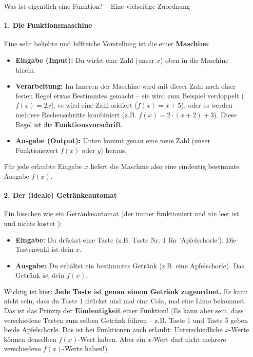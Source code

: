 \begin{infoboxumgebung}{Was ist eigentlich eine Funktion? – Eine vielseitige Zuordnung}
\paragraph{1. Die Funktionsmaschine}
Eine sehr beliebte und hilfreiche Vorstellung ist die einer \textbf{Maschine}:
\begin{itemize}
    \item \textbf{Eingabe (Input):} Du wirfst eine Zahl (unser $x$) oben in die Maschine hinein.
    \item \textbf{Verarbeitung:} Im Inneren der Maschine wird mit dieser Zahl nach einer festen Regel etwas Bestimmtes gemacht – sie wird zum Beispiel verdoppelt ($f(x)=2x$), es wird eine Zahl addiert ($f(x)=x+5$), oder es werden mehrere Rechenschritte kombiniert (z.B. $f(x) = 2 \cdot (x+2) + 3$). Diese Regel ist die \textbf{Funktionsvorschrift}.
    \item \textbf{Ausgabe (Output):} Unten kommt genau eine neue Zahl (unser Funktionswert $f(x)$ oder $y$) heraus.
\end{itemize}
Für jede erlaubte Eingabe $x$ liefert die Maschine also eine eindeutig bestimmte Ausgabe $f(x)$.

\paragraph{2. Der (ideale) Getränkeautomat}
Ein bisschen wie ein Getränkeautomat (der immer funktioniert und nie leer ist und nichts kostet \smiley{}):
\begin{itemize}
    \item \textbf{Eingabe:} Du drückst eine Taste (z.B. Taste Nr. 1 für 'Apfelschorle'). Die Tastenwahl ist dein $x$.
    \item \textbf{Ausgabe:} Du erhältst ein bestimmtes Getränk (z.B. eine Apfelschorle). Das Getränk ist dein $f(x)$.
\end{itemize}
Wichtig ist hier: \textbf{Jede Taste ist genau einem Getränk zugeordnet.} Es kann nicht sein, dass du Taste 1 drückst und mal eine Cola, mal eine Limo bekommst. Das ist das Prinzip der \textbf{Eindeutigkeit} einer Funktion! (Es kann aber sein, dass verschiedene Tasten zum selben Getränk führen – z.B. Taste 1 und Taste 5 geben beide Apfelschorle. Das ist bei Funktionen auch erlaubt: Unterschiedliche $x$-Werte können denselben $f(x)$-Wert haben. Aber ein $x$-Wert darf nicht mehrere verschiedene $f(x)$-Werte haben!)


\end{infoboxumgebung}
